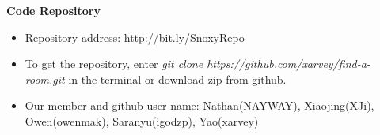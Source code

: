 \documentclass[50pt|a4paper]{letter}
\begin{document}
\centerline{\Large{\bf Code Repository}}
\bigskip

\begin{itemize}

\item Repository address: http://bit.ly/SnoxyRepo
\item To get the repository, enter \textit{git clone https://github.com/xarvey/find-a-room.git} in the terminal or download zip from github.
\item Our member and github user name: Nathan(NAYWAY), Xiaojing(XJi), Owen(owenmak), Saranyu(igodzp), Yao(xarvey)


\end{itemize}
\end{document}
